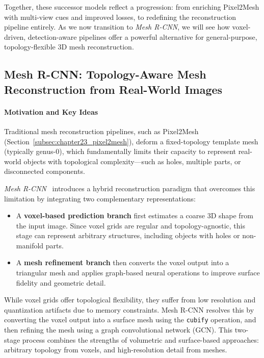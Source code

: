 Together, these successor models reflect a progression: from enriching Pixel2Mesh with multi-view cues and improved losses, to redefining the reconstruction pipeline entirely. As we now transition to \emph{Mesh R-CNN}, we will see how voxel-driven, detection-aware pipelines offer a powerful alternative for general-purpose, topology-flexible 3D mesh reconstruction.

\newpage

\subsection{Mesh R-CNN: Topology-Aware Mesh Reconstruction from Real-World Images}
\label{subsec:chapter23_meshrcnn}

\paragraph{Motivation and Key Ideas}

Traditional mesh reconstruction pipelines, such as Pixel2Mesh (Section~\ref{subsec:chapter23_pixel2mesh}), deform a fixed-topology template mesh (typically genus-0), which fundamentally limits their capacity to represent real-world objects with topological complexity---such as holes, multiple parts, or disconnected components.

\emph{Mesh R-CNN}~\cite{gkioxari2020_meshrcnn} introduces a hybrid reconstruction paradigm that overcomes this limitation by integrating two complementary representations:

\begin{itemize}
    \item A \textbf{voxel-based prediction branch} first estimates a coarse 3D shape from the input image. Since voxel grids are regular and topology-agnostic, this stage can represent arbitrary structures, including objects with holes or non-manifold parts.
    \item A \textbf{mesh refinement branch} then converts the voxel output into a triangular mesh and applies graph-based neural operations to improve surface fidelity and geometric detail.
\end{itemize}

While voxel grids offer topological flexibility, they suffer from low resolution and quantization artifacts due to memory constraints. Mesh R-CNN resolves this by converting the voxel output into a surface mesh using the \texttt{cubify} operation, and then refining the mesh using a graph convolutional network (GCN). This two-stage process combines the strengths of volumetric and surface-based approaches: arbitrary topology from voxels, and high-resolution detail from meshes.

